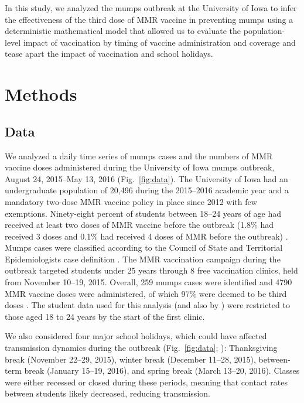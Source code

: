 \documentclass[12pt]{article}
\newcommand{\fref}[1]{Fig.~\ref{fig:#1}}
\begin{document}
In this study, we analyzed the mumps outbreak at the University of Iowa to infer the effectiveness of the third dose of MMR vaccine in preventing mumps using a deterministic mathematical model that allowed us to evaluate the population-level impact of vaccination by timing of vaccine administration and coverage and tease apart the impact of vaccination and school holidays.

\section{Methods}

\subsection{Data}

We analyzed a daily time series of mumps cases and the numbers of MMR vaccine doses administered during the University of Iowa mumps outbreak, August 24, 2015--May 13, 2016 (\fref{data}).
The University of Iowa had an undergraduate population of 20,496 during the 2015--2016 academic year and a mandatory two-dose MMR vaccine policy in place since 2012 with few exemptions.
Ninety-eight percent of students between 18--24 years of age had received at least two doses of MMR vaccine before the outbreak (1.8\% had received 3 doses and 0.1\% had received 4 doses of MMR before the outbreak) \citep{cardemil2017effectiveness}.
Mumps cases were classified according to the Council of State and Territorial Epidemiologists case definition \citep{casedef}. 
The MMR vaccination campaign during the outbreak targeted students under 25 years through 8 free vaccination clinics, held from November 10--19, 2015. 
Overall, 259 mumps cases were identified and 4790 MMR vaccine doses were administered, of which 97\% were deemed to be third doses \citep{cardemil2017effectiveness}.
The student data used for this analysis (and also by \cite{cardemil2017effectiveness}) were restricted to those aged 18 to 24 years by the start of the first clinic. 

We also considered four major school holidays, which could have affected transmission dynamics during the outbreak (\fref{data}; \cite{iowa}): 
Thanksgiving break (November 22--29, 2015), winter break (December 11--28, 2015), between-term break (January 15--19, 2016), and spring break (March 13--20, 2016).
Classes were either recessed or closed during these periods, meaning that contact rates between students likely decreased, reducing transmission.
\end{document}
